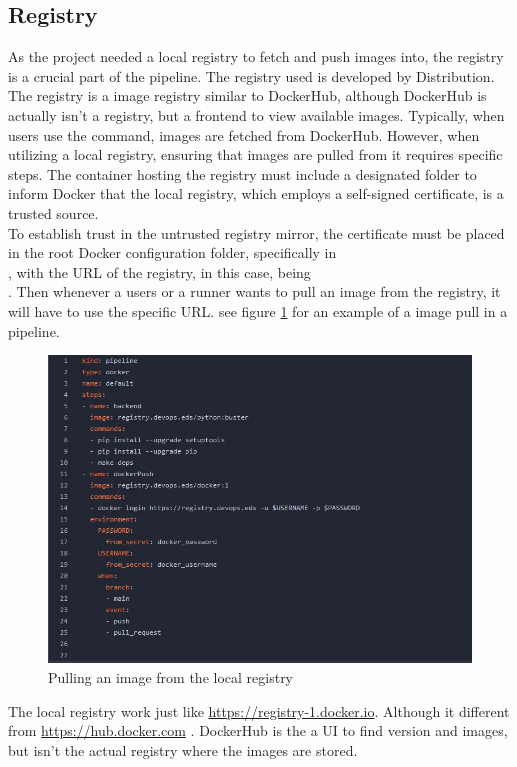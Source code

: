 \subsection{Registry}
\label{sec:pipeline-local-registry}
As the project needed a local registry to fetch and push images into, the registry is a crucial part of the pipeline.
The registry used is developed by Distribution.\cite{registry}
The registry is a image registry similar to DockerHub, although DockerHub is actually isn't a registry, but a 
frontend to view available images. 
Typically, when users use the  command, images are fetched from DockerHub. 
However, when utilizing a local registry, ensuring that images are pulled from it requires specific steps. 
The container hosting the registry must include a designated  folder to inform Docker that the local registry, 
which employs a self-signed certificate, is a trusted source.\\
To establish trust in the untrusted registry mirror, the certificate must be placed in the root Docker configuration folder, specifically in \\ 
, with the URL of the registry, in this case, being \\
.
Then whenever a users or a runner wants to pull an image from the registry, it will have to use the specific URL.
see figure \ref{fig:specific_registry_url} for 
an example of a image pull in a pipeline.\\
\begin{figure}
    \includegraphics[scale=0.65]{images/local-registry-pull.jpg}
    \caption{Pulling an image from the local registry}
    \label{fig:specific_registry_url}
\end{figure}
The local registry work just like \url{https://registry-1.docker.io}. Although it different from \url{https://hub.docker.com}
. DockerHub is the a UI to find version and images, but isn't the actual registry where the images are stored.

